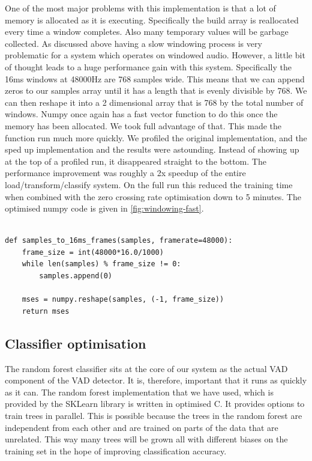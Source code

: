 \documentclass[ %
                    author={Sam Phippen},
                supervisor={Dr. Rafal Bogacz},
                     title={Real time voice activity detectors in noisy personal computing environments},
                  subtitle={},
                    degree={MEng},
                      year={2012} ]{thesis}
\begin{document}
One of the most major problems with this implementation is that a lot of memory
is allocated as it is executing. Specifically the build array is reallocated
every time a window completes. Also many temporary values will be garbage
collected. As discussed above having a slow windowing process is very
problematic for a system which operates on windowed audio. However, a little
bit of thought leads to a huge performance gain with this system. Specifically
the 16ms windows at 48000Hz are 768 samples wide. This means that we can append
zeros to our samples array until it has a length that is evenly divisible by
768. We can then reshape it into a 2 dimensional array that is 768 by the total
number of windows. Numpy once again has a fast vector function to do this once
the memory has been allocated. We took full advantage of that. This made the
function run much more quickly.  We profiled the original implementation, and
the sped up implementation and the results were astounding. Instead of showing
up at the top of a profiled run, it disappeared straight to the bottom. The
performance improvement was roughly a 2x speedup of the entire
load/transform/classify system. On the full run this reduced the training time
when combined with the zero crossing rate optimisation down to 5 minutes. The
optimised numpy code is given in \ref{fig:windowing-fast}.

\begin{lstlisting}[frame=single,caption=Optimised windowing implementation, label=list:windowing-fast]

def samples_to_16ms_frames(samples, framerate=48000):
    frame_size = int(48000*16.0/1000)
    while len(samples) % frame_size != 0:
        samples.append(0)

    mses = numpy.reshape(samples, (-1, frame_size))
    return mses

\end{lstlisting}

\subsection{Classifier optimisation}

The random forest classifier sits at the core of our system as the actual VAD
component of the VAD detector. It is, therefore, important that it runs as
quickly as it can. The random forest implementation that we have used, which is
provided by the SKLearn library is written in optimised C. It provides options
to train trees in parallel. This is possible because the trees in the random
forest are independent from each other and are trained on parts of the data
that are unrelated. This way many trees will be grown all with different biases
on the training set in the hope of improving classification accuracy.
\end{document}
